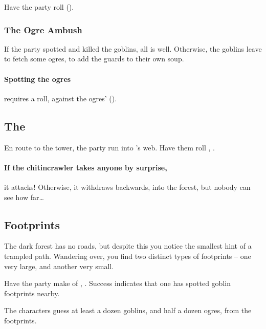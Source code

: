 \begin{multicols}{2}
Have the party roll  (\tn[10]).

\subsubsection{The Ogre Ambush}

If the party spotted and killed the goblins, all is well.
Otherwise, the goblins leave to fetch some ogres, to add the guards to their own soup.

\randomfour

\ogre

\paragraph{Spotting the \glspl{ogre}}
requires a  roll, against the ogres'  (\tn).

\subsection{The }

En route to the tower, the party run into 's web.
Have them roll , \tn[10].

\chitincrawler

\paragraph{If the chitincrawler takes anyone by surprise,}
it attacks!
Otherwise, it withdraws backwards, into the forest, but nobody can see how far\ldots

\subsection{Footprints}

\begin{boxtext}
  The dark forest has no roads, but despite this you notice the smallest hint of a trampled path.
  Wandering over, you find two distinct types of footprints -- one very large, and another very small.
\end{boxtext}

\noindent
Have the party make  of , \tn[10].
Success indicates that one has spotted goblin footprints nearby.

The characters guess at least a dozen goblins, and half a dozen ogres, from the footprints.


\end{multicols}
